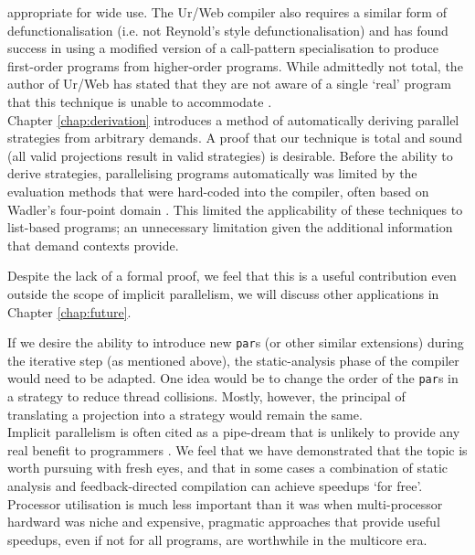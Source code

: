 appropriate for wide use. The Ur/Web compiler also requires a similar form of
defunctionalisation (i.e. not Reynold's style defunctionalisation)
\citep{ur-web} and has found success in using a modified version of a
call-pattern specialisation \citep{call-pattern-spec} to produce first-order
programs from higher-order programs. While admittedly not total, the author of
Ur/Web has stated that they are not aware of a single `real' program that this
technique is unable to accommodate \citep{chlipala}.
\\[0.35cm]
Chapter \ref{chap:derivation} introduces a method of automatically deriving
parallel strategies from arbitrary demands. A proof that our technique is total
and sound (all valid projections result in valid strategies) is desirable.
Before the ability to derive strategies, parallelising programs automatically
was limited by the evaluation methods that were hard-coded into the compiler,
often based on Wadler's four-point domain \citep{hogen1992automatic,
burn1987evaluation}.  This limited the applicability of these techniques to
list-based programs; an unnecessary limitation given the additional information
that demand contexts provide.

Despite the lack of a formal proof, we feel that this is a useful contribution
even outside the scope of implicit parallelism, we will discuss other
applications in Chapter \ref{chap:future}.

If we desire the ability to introduce new \verb|par|s (or other similar
extensions) during the iterative step (as mentioned above), the static-analysis
phase of the compiler would need to be adapted. One idea would be to change the
order of the \verb|par|s in a strategy to reduce thread collisions. Mostly,
however, the principal of translating a projection into a strategy would remain
the same.
\\[0.35cm]
Implicit parallelism is often cited as a pipe-dream that is unlikely to provide
any real benefit to programmers \citep{spjQuote1999, marlowBook, benEmail,
hammond2000research}.  We feel that we have demonstrated that the topic is
worth pursuing with fresh eyes, and that in some cases a combination of static
analysis and feedback-directed compilation can achieve speedups `for free'.
Processor utilisation is much less important than it was when multi-processor
hardward was niche and expensive, pragmatic approaches that provide useful
speedups, even if not for all programs, are worthwhile in the multicore
era.
